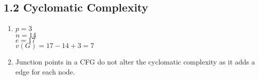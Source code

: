 \documentclass{scrartcl}
\begin{document}
\subsection*{1.2 Cyclomatic Complexity}
\begin{enumerate}
	\item $ p = 3 $ \\
		$ n = 14 $ \\
		$ e = 17 $ \\
		$ v(G) = 17 - 14 + 3 = 7 $ 
	
	\item Junction points in a CFG do not alter the cyclomatic complexity as it adds a edge for each node.
	
\end{enumerate}
\end{document}
